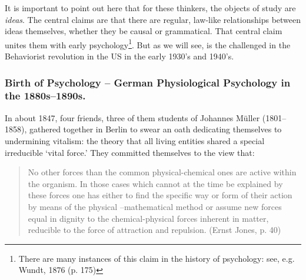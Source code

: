 It is important to point out here that for these thinkers, the objects of study are \emph{ideas}. The central claims are that there are regular, law-like relationships between ideas themselves, whether they be causal or grammatical. That central claim unites them with early psychology\footnote{There are many instances of this claim in the history of psychology: see, e.g. Wundt, 1876 (p. 175)}. But as we will see, is the challenged in the Behaviorist revolution in the US in the early 1930's and 1940's.

\subsubsection{Birth of Psychology – German Physiological Psychology in the 1880s--1890s.}
\label{birthofpsychology–germanphysiologicalpsychologyinthe1880s-1890s.}

In about 1847, four friends, three of them students of Johannes Müller (1801--1858), gathered together in Berlin to swear an oath dedicating themselves to undermining vitalism: the theory that all living entities shared a special irreducible `vital force.' They committed themselves to the view that:

\begin{quote}

No other forces than the common physical-chemical ones are active within the organism. In those cases which cannot at the time be explained by these forces one has either to find the specific way or form of their action by means of the physical –mathematical method or assume new forces equal in dignity to the chemical-physical forces inherent in matter, reducible to the force of attraction and repulsion. (Ernst Jones, p. 40)
\end{quote}

